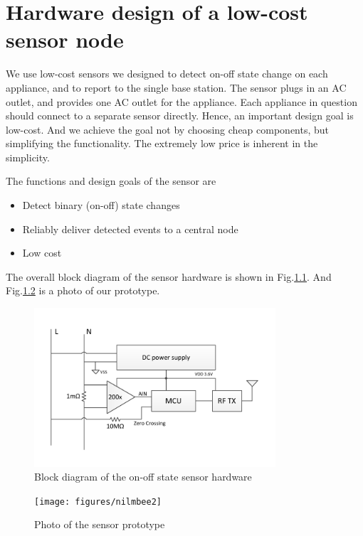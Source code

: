 \chapter{Hardware design of a low-cost sensor node}\label{chap3}

We use low-cost sensors we designed to detect on-off state change on each appliance, and to report to the single base station. The sensor plugs in an AC outlet, and provides one AC outlet for the appliance. Each appliance in question should connect to a separate sensor directly. Hence, an important design goal is low-cost. And we achieve the goal not by choosing cheap components, but simplifying the functionality. The extremely low price is inherent in the simplicity. 


The functions and design goals of the sensor are
\begin{itemize}
  \item Detect binary (on-off) state changes
  \item Reliably deliver detected events to a central node
  \item Low cost
\end{itemize}

The overall block diagram of the sensor hardware is shown in Fig.\ref{fig:hwoverview}. And Fig.\ref{fig:sensor} is a photo of our prototype. 

\begin{figure}[htb]
  \centering
  \includegraphics[width=0.8\textwidth]{figures/hwoverview}
  \caption{Block diagram of the on-off state sensor hardware}
  \label{fig:hwoverview}
\end{figure}

\begin{figure}[htb]
  \centering
  \texttt{[image: figures/nilmbee2]}
  \caption{Photo of the sensor prototype}
  \label{fig:sensor}
\end{figure}

